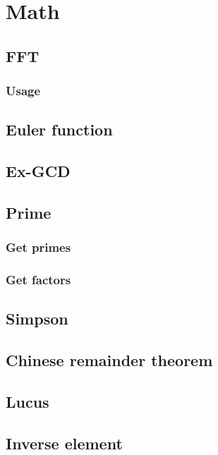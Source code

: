 \section{Math}
\subsection{FFT}

\subsubsection{Usage}


\subsection{Euler function}


\subsection{Ex-GCD}


\subsection{Prime}
\subsubsection{Get primes}

\subsubsection{Get factors}


\subsection{Simpson}


\subsection{Chinese remainder theorem}


\subsection{Lucus}


\subsection{Inverse element}


